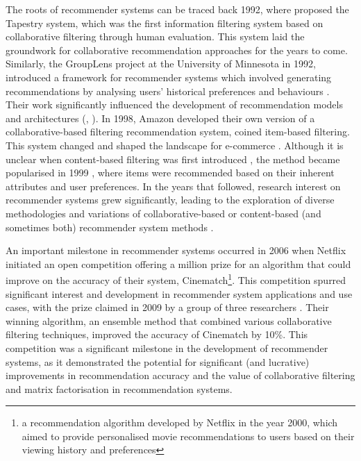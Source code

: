 The roots of recommender systems can be traced back 1992, where \cite{goldberg1992using} proposed the Tapestry system, which was the first information filtering system based on collaborative filtering through human evaluation. This system laid the groundwork for collaborative recommendation approaches for the years to come. Similarly, the GroupLens project at the University of Minnesota in 1992, introduced a framework for recommender systems which involved generating recommendations by analysing users' historical preferences and behaviours \cite{konstan1997grouplens}. Their work significantly influenced the development of recommendation models and architectures (\cite{konstan1997grouplens}, \cite{huang2004applying}). In 1998, Amazon developed their own version of a collaborative-based filtering recommendation system, coined item-based filtering. This system changed and shaped the landscape for e-commerce \cite{linden2003amazon}. Although it is unclear when content-based filtering was first introduced \cite{balabanovic1997fab}, the method became popularised in 1999 \cite{herlocker1999algorithmic}, where items were recommended based on their inherent attributes and user preferences. In the years that followed, research interest on recommender systems grew significantly, leading to the exploration of diverse methodologies and variations of collaborative-based or content-based (and sometimes both) recommender system methods \cite{burke2002hybrid}. 

An important milestone in recommender systems occurred in 2006 when Netflix initiated an open competition offering a  million prize for an algorithm that could improve on the accuracy of their system, Cinematch\footnote{a recommendation algorithm developed by Netflix in the year 2000, which aimed to provide personalised movie recommendations to users based on their viewing history and preferences}. This competition spurred significant interest and development in recommender system applications and use cases, with the prize claimed in 2009 by a group of three researchers \cite{bennett2007netflix}. Their winning algorithm, an ensemble method that combined various collaborative filtering techniques, improved the accuracy of Cinematch by 10\%. This competition was a significant milestone in the development of recommender systems, as it demonstrated the potential for significant (and lucrative) improvements in recommendation accuracy and the value of collaborative filtering and matrix factorisation in recommendation systems.


